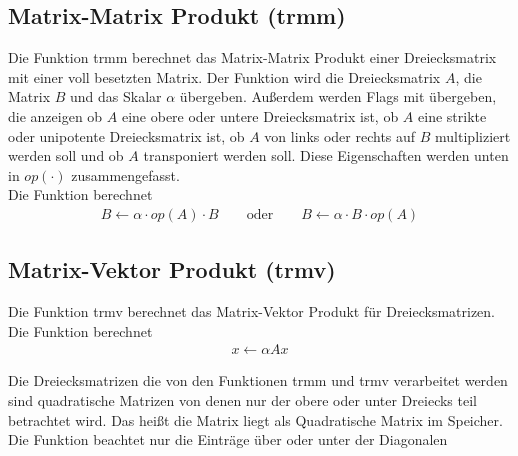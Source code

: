 \subsection{Matrix-Matrix Produkt (trmm)} \label{fkt:trmm}
Die Funktion \glqq trmm\grqq{} berechnet das Matrix-Matrix Produkt einer Dreiecksmatrix mit einer voll besetzten Matrix.
Der Funktion wird die Dreiecksmatrix $A$, die Matrix $B$ und das Skalar $\alpha$ übergeben. Außerdem werden Flags mit übergeben, die anzeigen ob $A$ eine obere oder untere Dreiecksmatrix ist, ob $A$ eine strikte oder unipotente Dreiecksmatrix ist, ob $A$ von links oder rechts auf $B$ multipliziert werden soll und ob $A$ transponiert werden soll. Diese Eigenschaften werden unten in $op(\cdot)$ zusammengefasst. \\
Die Funktion berechnet
\begin{align}
B \leftarrow  \alpha \cdot op(A) \cdot B \qquad \text{oder} \qquad B \leftarrow  \alpha \cdot B \cdot op(A)
\end{align}
\subsection{Matrix-Vektor Produkt (trmv)} \label{fkt:trmv}
Die Funktion \glqq trmv\grqq{} berechnet das Matrix-Vektor Produkt für Dreiecksmatrizen.
Die Funktion berechnet
\begin{align}
x \leftarrow \alpha  Ax %
\end{align}


Die Dreiecksmatrizen die von den Funktionen \glqq trmm\grqq{} und \glqq trmv\grqq{} verarbeitet werden sind quadratische Matrizen von denen nur der obere oder unter Dreiecks teil betrachtet wird.
Das heißt die Matrix liegt als Quadratische Matrix im Speicher. Die Funktion beachtet nur die Einträge über oder unter der Diagonalen


